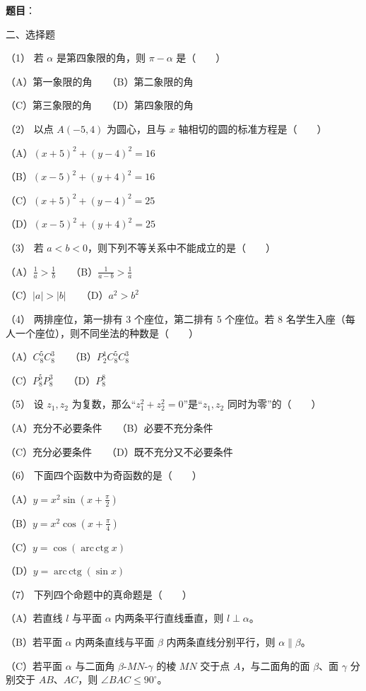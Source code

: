 \begin{answer}

\textbf{题目}：

二、选择题

（1） 若 $\alpha$ 是第四象限的角，则 $\pi-\alpha$ 是\mbox{（　　）}

（A）第一象限的角　　（B）第二象限的角

（C）第三象限的角　　（D）第四象限的角

（2） 以点 $A(-5,4)$ 为圆心，且与 $x$ 轴相切的圆的标准方程是\mbox{（　　）}

（A）$(x+5)^2+(y-4)^2=16$

（B）$(x-5)^2+(y+4)^2=16$

（C）$(x+5)^2+(y-4)^2=25$

（D）$(x-5)^2+(y+4)^2=25$

（3） 若 $a<b<0$，则下列不等关系中不能成立的是\mbox{（　　）}

（A）$\frac1a>\frac1b$　　（B）$\frac1{a-b}>\frac1a$

（C）$|a|>|b|$　　（D）$a^2>b^2$

（4） 两排座位，第一排有 3 个座位，第二排有 5 个座位。若 8 名学生入座（每人一个座位），则不同坐法的种数是\mbox{（　　）}

（A）$C_8^5C_8^3$　　（B）$P_2^1C_8^5C_8^3$

（C）$P_8^5P_8^3$　　（D）$P_8^8$

（5） 设 $z_1,z_2$ 为复数，那么“$z_1^2+z_2^2=0$”是“$z_1,z_2$ 同时为零”的\mbox{（　　）}

（A）充分不必要条件　　（B）必要不充分条件

（C）充分必要条件　　（D）既不充分又不必要条件

（6） 下面四个函数中为奇函数的是\mbox{（　　）}

（A）$y=x^2\sin\left(x+\frac\pi2\right)$

（B）$y=x^2\cos\left(x+\frac\pi4\right)$

（C）$y=\cos(\operatorname{arc\,ctg}x)$

（D）$y=\operatorname{arc\,ctg}(\sin x)$

（7） 下列四个命题中的真命题是\mbox{（　　）}

（A）若直线 $l$ 与平面 $\alpha$ 内两条平行直线垂直，则 $l\perp\alpha$。

（B）若平面 $\alpha$ 内两条直线与平面 $\beta$ 内两条直线分别平行，则 $\alpha\parallel\beta$。

（C）若平面 $\alpha$ 与二面角 $\beta$-$MN$-$\gamma$ 的棱 $MN$ 交于点 $A$，与二面角的面 $\beta$、面 $\gamma$ 分别交于 $AB$、$AC$，则 $\angle BAC\le90^\circ$。


\end{answer}
